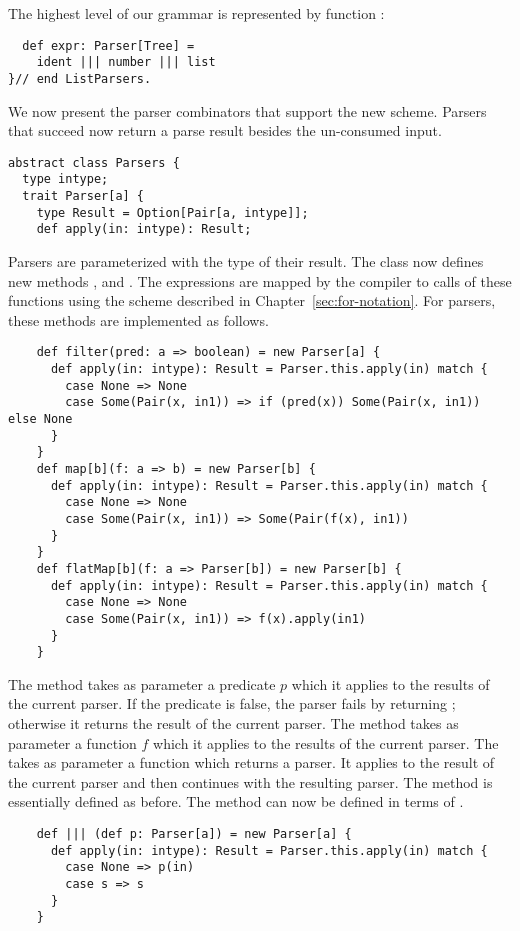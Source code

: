 {The highest level of our grammar is represented by function
:
\begin{lstlisting}
  def expr: Parser[Tree] = 
    ident ||| number ||| list
}// end ListParsers.
\end{lstlisting}
We now present the parser combinators that support the new
scheme. Parsers that succeed now return a parse result besides the
un-consumed input.
\begin{lstlisting}
abstract class Parsers {
  type intype;
  trait Parser[a] {
    type Result = Option[Pair[a, intype]];
    def apply(in: intype): Result;
\end{lstlisting}
Parsers are parameterized with the type of their result. The class
 now defines new methods , 
and . The  expressions are mapped by the
compiler to calls of these functions using the scheme described in
Chapter~\ref{sec:for-notation}. For parsers, these methods are
implemented as follows.
\begin{lstlisting}
    def filter(pred: a => boolean) = new Parser[a] {
      def apply(in: intype): Result = Parser.this.apply(in) match {
        case None => None
        case Some(Pair(x, in1)) => if (pred(x)) Some(Pair(x, in1)) else None
      }
    }
    def map[b](f: a => b) = new Parser[b] {
      def apply(in: intype): Result = Parser.this.apply(in) match {
        case None => None
        case Some(Pair(x, in1)) => Some(Pair(f(x), in1))
      }
    }
    def flatMap[b](f: a => Parser[b]) = new Parser[b] {
      def apply(in: intype): Result = Parser.this.apply(in) match {
        case None => None
        case Some(Pair(x, in1)) => f(x).apply(in1)
      }
    }
\end{lstlisting}
The  method takes as parameter a predicate $p$ which it
applies to the results of the current parser. If the predicate is
false, the parser fails by returning ; otherwise it returns
the result of the current parser.  The  method takes as
parameter a function $f$ which it applies to the results of the
current parser. The  takes as parameter a function
 which returns a parser.  It applies  to the result of
the current parser and then continues with the resulting parser.  The
\code{|||} method is essentially defined as before.  The
\code{&&&} method can now be defined in terms of .
\begin{lstlisting}
    def ||| (def p: Parser[a]) = new Parser[a] {
      def apply(in: intype): Result = Parser.this.apply(in) match {
        case None => p(in)
        case s => s
      }
    }


\end{lstlisting}}
